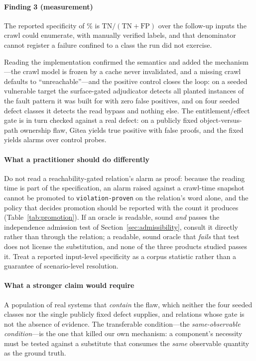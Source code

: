 \paragraph{Finding 3 (measurement)} The reported specificity of \ResLitReportedSpecPct{}\% is
$\mathrm{TN}/(\mathrm{TN}+\mathrm{FP})$ over the follow-up inputs the crawl could enumerate, with
manually verified labels, and that denominator cannot register a failure confined to a class the
run did not exercise.

Reading the implementation confirmed the semantics and added the mechanism---the crawl model is
frozen by a cache never invalidated, and a missing crawl defaults to ``unreachable''---and the
positive control closes the loop: on a seeded vulnerable target the surface-gated adjudicator
detects all planted instances of the fault pattern it was built for with zero false positives, and
on four seeded defect classes it detects the read bypass and nothing else. The entitlement/effect
gate is in turn checked against a real defect: on a publicly fixed object-versus-path ownership
flaw, Gitea \CveVulnVersion{} yields \CveTruePositives{} true positive with \CveFalseProofs{} false
proofs, and the fixed \CveFixedVersion{} yields \CveFixedAlarms{} alarms over \CveControls{}
control probes.

\paragraph{What a practitioner should do differently} Do not read a reachability-gated relation's
alarm as proof: because the reading time is part of the specification, an alarm raised against a
crawl-time snapshot cannot be promoted to \texttt{violation-proven} on the relation's word alone,
and the policy that decides promotion should be reported with the count it produces
(Table~\ref{tab:promotion}). If an oracle is readable, sound \emph{and} passes the independence
admission test of Section~\ref{sec:admissibility}, consult it directly rather than through the
relation; a readable, sound oracle that \emph{fails} that test does not license the substitution,
and none of the three products studied passes it. Treat a reported input-level specificity as a
corpus statistic rather than a guarantee of scenario-level resolution.

\paragraph{What a stronger claim would require} A population of real systems that \emph{contain}
the flaw, which neither the four seeded classes nor the single publicly fixed defect supplies, and
relations whose gate is not the absence of evidence. The transferable condition---the
\emph{same-observable condition}---is the one that killed our own mechanism: a component's
necessity must be tested against a substitute that consumes the \emph{same} observable quantity as
the ground truth.
